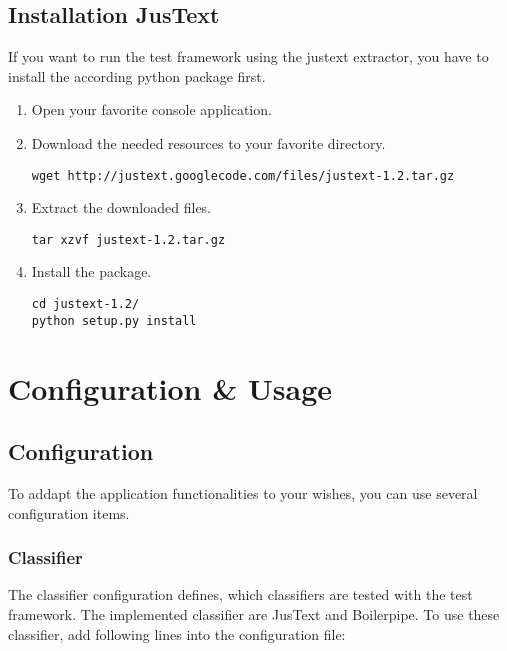 \subsection{Installation JusText}
\label{userManual:InstallationJusText}
If you want to run the test framework using the justext extractor, you have to install the according python package first.

\begin{enumerate}
\item Open your favorite console application.
\item Download the needed resources to your favorite directory.
\begin{lstlisting}
wget http://justext.googlecode.com/files/justext-1.2.tar.gz
\end{lstlisting}

\item Extract the downloaded files.
\begin{lstlisting}
tar xzvf justext-1.2.tar.gz
\end{lstlisting}


\item Install the package.
\begin{lstlisting}
cd justext-1.2/
python setup.py install
\end{lstlisting}





\end{enumerate}


\section{Configuration \& Usage}

\subsection{Configuration}

To addapt the application functionalities to your wishes, you can use several configuration items.

\subsubsection{Classifier}

The classifier configuration defines, which classifiers are tested with the test framework. The implemented classifier are JusText and Boilerpipe.
To use these classifier, add following lines into the configuration file:


